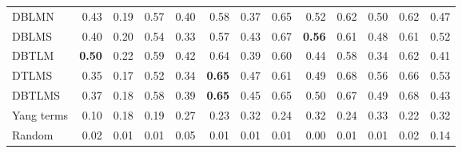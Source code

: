 \begin{tabular}{@{}lrrrrrrrrrrrr@{}}
DBLMN & 0.43 & 0.19 & 0.57 & 0.40 & 0.58 & 0.37 & 0.65 & 0.52 & 0.62 & 0.50 & 0.62 & 0.47 \\
DBLMS & 0.40 & 0.20 & 0.54 & 0.33 & 0.57 & 0.43 & 0.67 & \textbf{0.56} & 0.61 & 0.48 & 0.61 & 0.52 \\
DBTLM & \textbf{0.50} & 0.22 & 0.59 & 0.42 & 0.64 & 0.39 & 0.60 & 0.44 & 0.58 & 0.34 & 0.62 & 0.41 \\
DTLMS & 0.35 & 0.17 & 0.52 & 0.34 & \textbf{0.65} & 0.47 & 0.61 & 0.49 & 0.68 & 0.56 & 0.66 & 0.53 \\
DBTLMS & 0.37 & 0.18 & 0.58 & 0.39 & \textbf{0.65} & 0.45 & 0.65 & 0.50 & 0.67 & 0.49 & 0.68 & 0.43 \\
\midrule
Yang terms & 0.10 & 0.18 & 0.19 & 0.27 & 0.23 & 0.32 & 0.24 & 0.32 & 0.24 & 0.33 & 0.22 & 0.32 \\
Random & 0.02 & 0.01 & 0.01 & 0.05 & 0.01 & 0.01 & 0.01 & 0.00 & 0.01 & 0.01 & 0.02 & 0.14 \\
\bottomrule
\end{tabular}
